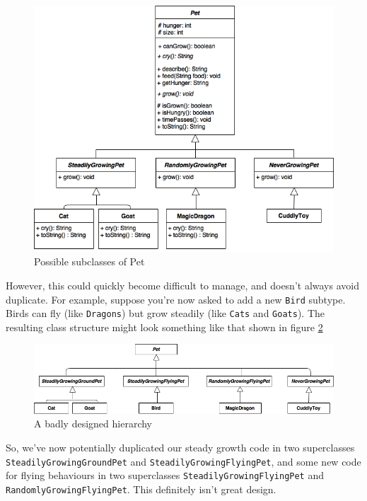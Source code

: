 \documentclass[
]{book}
\begin{document}
\begin{figure}

{\centering \includegraphics[width=1\linewidth]{images/GrowthSubclasses} 

}

\caption{Possible subclasses of Pet}\label{fig:petsubclasses-fig}
\end{figure}

However, this could quickly become difficult to manage, and doesn't always avoid duplicate. For example, suppose you're now asked to add a new \texttt{Bird} subtype. Birds can fly (like \texttt{Dragons}) but grow steadily (like \texttt{Cats} and \texttt{Goats}). The resulting class structure might look something like that shown in figure \ref{fig:petsubclasses2-fig}

\begin{figure}

{\centering \includegraphics[width=1\linewidth]{images/GrowthSubclasses2} 

}

\caption{A badly designed hierarchy}\label{fig:petsubclasses2-fig}
\end{figure}

So, we've now potentially duplicated our steady growth code in two superclasses \texttt{SteadilyGrowingGroundPet} and \texttt{SteadilyGrowingFlyingPet}, and some new code for flying behaviours in two superclasses \texttt{SteadilyGrowingFlyingPet} and \texttt{RandomlyGrowingFlyingPet}. This definitely isn't great design.
\end{document}
